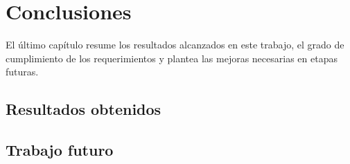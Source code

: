 
\chapter{Conclusiones} %

\label{Chapter5} %



El último capítulo resume los resultados alcanzados en este trabajo, el grado de cumplimiento de los requerimientos y plantea las mejoras necesarias en etapas futuras.

\section{Resultados obtenidos}



\section{Trabajo futuro}

